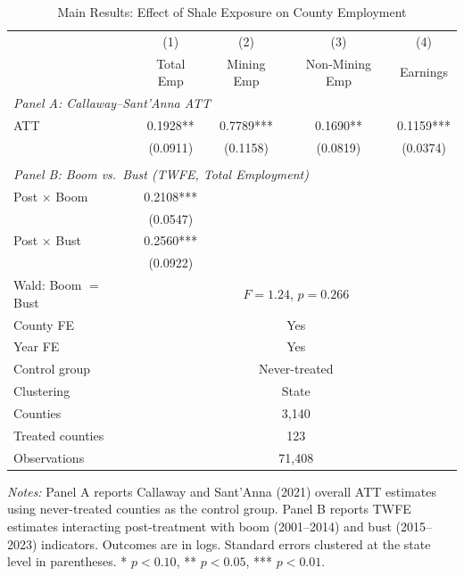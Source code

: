 \begin{table}[H]
\centering
\caption{Main Results: Effect of Shale Exposure on County Employment}
\begin{threeparttable}
\begin{tabular}{lcccc}
\toprule
 & (1) & (2) & (3) & (4) \\
 & Total Emp & Mining Emp & Non-Mining Emp & Earnings \\
\midrule
\multicolumn{5}{l}{\textit{Panel A: Callaway--Sant'Anna ATT}} \\[3pt]
ATT & 0.1928** & 0.7789*** & 0.1690** & 0.1159*** \\
 & (0.0911) & (0.1158) & (0.0819) & (0.0374) \\
\\
\multicolumn{5}{l}{\textit{Panel B: Boom vs.\ Bust (TWFE, Total Employment)}} \\[3pt]
Post $\times$ Boom & 0.2108*** & & & \\
 & (0.0547) & & & \\
Post $\times$ Bust & 0.2560*** & & & \\
 & (0.0922) & & & \\
Wald: Boom $=$ Bust & \multicolumn{4}{c}{$F = 1.24$, $p = 0.266$} \\
\midrule
County FE & \multicolumn{4}{c}{Yes} \\
Year FE & \multicolumn{4}{c}{Yes} \\
Control group & \multicolumn{4}{c}{Never-treated} \\
Clustering & \multicolumn{4}{c}{State} \\
Counties & \multicolumn{4}{c}{3,140} \\
Treated counties & \multicolumn{4}{c}{123} \\
Observations & \multicolumn{4}{c}{71,408} \\
\bottomrule
\end{tabular}
\begin{tablenotes}[flushleft]
\small
\item \textit{Notes:} Panel A reports Callaway and Sant'Anna (2021) overall ATT estimates using never-treated counties as the control group. Panel B reports TWFE estimates interacting post-treatment with boom (2001--2014) and bust (2015--2023) indicators. Outcomes are in logs. Standard errors clustered at the state level in parentheses. * $p<0.10$, ** $p<0.05$, *** $p<0.01$.
\end{tablenotes}
\end{threeparttable}
\label{tab:main}
\end{table}
